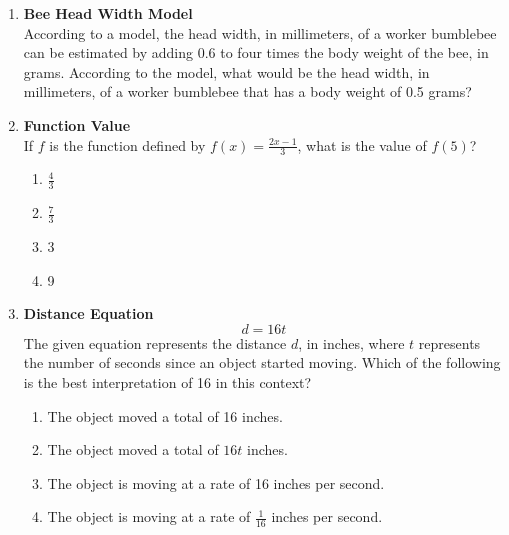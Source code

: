 \begin{enumerate}
\item \textbf{Bee Head Width Model}\\
According to a model, the head width, in millimeters, of a worker bumblebee can be estimated by adding 0.6 to four times the body weight of the bee, in grams. According to the model, what would be the head width, in millimeters, of a worker bumblebee that has a body weight of 0.5 grams?
\begin{subanswer}
\end{subanswer}

\newpage

\item \textbf{Function Value}\\
If $f$ is the function defined by $f(x) = \frac{2x-1}{3}$, what is the value of $f(5)$?
\begin{enumerate}[label=(\Alph*)]
  \item $\frac{4}{3}$
  \item $\frac{7}{3}$
  \item 3
  \item 9
\end{enumerate}
\begin{subanswer}
\end{subanswer}

\item \textbf{Distance Equation}\\
$$
d = 16t
$$
The given equation represents the distance $d$, in inches, where $t$ represents the number of seconds since an object started moving. Which of the following is the best interpretation of 16 in this context?
\begin{enumerate}[label=(\Alph*)]
  \item The object moved a total of 16 inches.
  \item The object moved a total of $16t$ inches.
  \item The object is moving at a rate of 16 inches per second.
  \item The object is moving at a rate of $\frac{1}{16}$ inches per second.
\end{enumerate}
\begin{subanswer}
\end{subanswer}


\end{enumerate}

